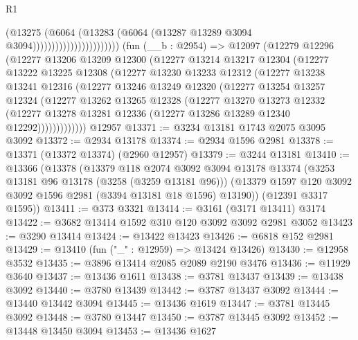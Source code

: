\begin{lexlean}{R1}
\begin{coremodule}
                                        (@13275
                                          (@6064
                                            (@13283
                                              (@6064
                                                (@13287 @13289 @3094 @3094)))))))))))))))))))))))
    (fun (__b : @2954) =>
    @12097
      (@12279
        @12296
        (@12277
          @13206
          @13209
          @12300
          (@12277
            @13214
            @13217
            @12304
            (@12277
              @13222
              @13225
              @12308
              (@12277
                @13230
                @13233
                @12312
                (@12277
                  @13238
                  @13241
                  @12316
                  (@12277
                    @13246
                    @13249
                    @12320
                    (@12277
                      @13254
                      @13257
                      @12324
                      (@12277
                        @13262
                        @13265
                        @12328
                        (@12277
                          @13270
                          @13273
                          @12332
                          (@12277
                            @13278
                            @13281
                            @12336
                            (@12277 @13286 @13289 @12340 @12292)))))))))))))
    @12957
@13371 := @3234 @13181 @1743 @2075 @3095 @3092
@13372 := @2934 @13178
@13374 := @2934 @1596 @2981
@13378 := @13371 (@13372 @13374) (@2960 @12957)
@13379 := @3244 @13181
@13410 := @13366
    (@13378
      (@13379
        @118
        @2074
        @3092
        @3094
        @13178
        @13374
        (@3253 @13181 @96 @13178 (@3258 (@3259 @13181 @96)))
        (@13379 @1597 @120 @3092 @3092 @1596 @2981 (@3394 @13181 @18 @1596) @13190))
      (@12391 @3317 @1595))
@13411 := @373 @3321
@13414 := @3161 (@3171 @13411) @3174
@13422 := @3682 @13414 @1592 @310 @120 @3092 @3092 @2981 @3052
@13423 := @3290 @13414
@13424 := @13422 @13423
@13426 := @6818 @152 @2981
@13429 := @13410 (fun ("_" : @12959) => @13424 @13426)
@13430 := @12958 @3532
@13435 := @3896 @13414 @2085 @2089 @2190 @3476
@13436 := @11929 @3640
@13437 := @13436 @1611
@13438 := @3781 @13437
@13439 := @13438 @3092
@13440 := @3780 @13439
@13442 := @3787 @13437 @3092
@13444 := @13440 @13442 @3094
@13445 := @13436 @1619
@13447 := @3781 @13445 @3092
@13448 := @3780 @13447
@13450 := @3787 @13445 @3092
@13452 := @13448 @13450 @3094
@13453 := @13436 @1627

\end{coremodule}
\end{lexlean}
